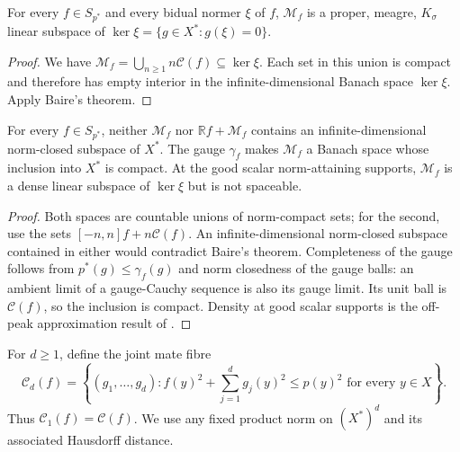 \documentclass[10pt]{amsart}
\newcommand{\R}{\mathbb R}
\newcommand{\Cset}{\mathcal C}
\begin{document}
\begin{corollary}\label{cor:gcr-meagre-domain}
For every $f\in S_{p^*}$ and every bidual normer $\xi$ of $f$,
$\mathcal M_f$ is a proper, meagre, $K_\sigma$ linear subspace
of $\ker\xi=\{g\in X^*:g(\xi)=0\}$.
\end{corollary}
\begin{proof}
We have $\mathcal M_f=\bigcup_{n\ge1}n\Cset(f)\subseteq\ker\xi$.
Each set in this union is compact and therefore has empty
interior in the infinite-dimensional Banach space $\ker\xi$.
Apply Baire's theorem.
\end{proof}

\begin{corollary}
\label{cor:gcr-no-spaceability}
For every $f\in S_{p^*}$, neither $\mathcal M_f$ nor
$\R f+\mathcal M_f$ contains an infinite-dimensional
norm-closed subspace of $X^*$. The gauge $\gamma_f$ makes
$\mathcal M_f$ a Banach space whose inclusion into $X^*$
is compact. At the good scalar norm-attaining supports,
$\mathcal M_f$ is a dense linear subspace of $\ker\xi$
but is not spaceable.
\end{corollary}
\begin{proof}
Both spaces are countable unions of norm-compact sets;
for the second, use the sets $[-n,n]f+n\Cset(f)$.
An infinite-dimensional norm-closed subspace contained in
either would contradict Baire's theorem. Completeness of
the gauge follows from $p^*(g)\le\gamma_f(g)$ and norm
closedness of the gauge balls: an ambient limit of a
gauge-Cauchy sequence is also its gauge limit. Its unit
ball is $\Cset(f)$, so the inclusion is compact.
Density at good scalar supports is the off-peak approximation
result of \cite[Proposition~2.1]{Check}.
\end{proof}

For $d\ge1$, define the joint mate fibre
\[
 \Cset_d(f)=\left\{(g_1,\ldots,g_d):
       f(y)^2+\sum_{j=1}^d g_j(y)^2\le p(y)^2
       \text{ for every }y\in X\right\}.
\]
Thus $\Cset_1(f)=\Cset(f)$. We use any fixed product norm
on $(X^*)^d$ and its associated Hausdorff distance.
\end{document}
